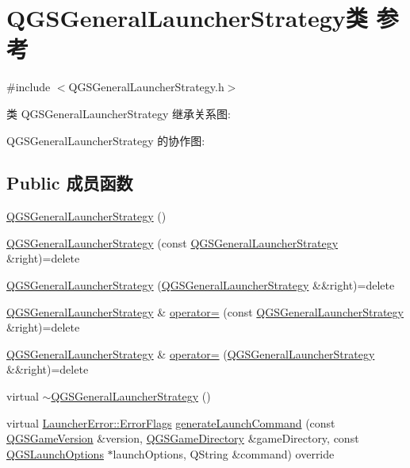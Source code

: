 \hypertarget{class_q_g_s_general_launcher_strategy}{}\section{Q\+G\+S\+General\+Launcher\+Strategy类 参考}
\label{class_q_g_s_general_launcher_strategy}


{\ttfamily \#include $<$Q\+G\+S\+General\+Launcher\+Strategy.\+h$>$}



类 Q\+G\+S\+General\+Launcher\+Strategy 继承关系图\+:


Q\+G\+S\+General\+Launcher\+Strategy 的协作图\+:
\subsection*{Public 成员函数}
\begin{DoxyCompactItemize}
\item 
\mbox{\hyperlink{class_q_g_s_general_launcher_strategy_a47665c69c318a04ef1b7cfad2ba02b64}{Q\+G\+S\+General\+Launcher\+Strategy}} ()
\item 
\mbox{\hyperlink{class_q_g_s_general_launcher_strategy_a2b0a45439670614c8e7a3dc3b9b957d9}{Q\+G\+S\+General\+Launcher\+Strategy}} (const \mbox{\hyperlink{class_q_g_s_general_launcher_strategy}{Q\+G\+S\+General\+Launcher\+Strategy}} \&right)=delete
\item 
\mbox{\hyperlink{class_q_g_s_general_launcher_strategy_abc0475b4a66105a949dbd39a6ce76596}{Q\+G\+S\+General\+Launcher\+Strategy}} (\mbox{\hyperlink{class_q_g_s_general_launcher_strategy}{Q\+G\+S\+General\+Launcher\+Strategy}} \&\&right)=delete
\item 
\mbox{\hyperlink{class_q_g_s_general_launcher_strategy}{Q\+G\+S\+General\+Launcher\+Strategy}} \& \mbox{\hyperlink{class_q_g_s_general_launcher_strategy_a0ca98a1ba31ce11c116f0b41b31785ea}{operator=}} (const \mbox{\hyperlink{class_q_g_s_general_launcher_strategy}{Q\+G\+S\+General\+Launcher\+Strategy}} \&right)=delete
\item 
\mbox{\hyperlink{class_q_g_s_general_launcher_strategy}{Q\+G\+S\+General\+Launcher\+Strategy}} \& \mbox{\hyperlink{class_q_g_s_general_launcher_strategy_a9bbe96ddfc22ca3d838d838fac810b5d}{operator=}} (\mbox{\hyperlink{class_q_g_s_general_launcher_strategy}{Q\+G\+S\+General\+Launcher\+Strategy}} \&\&right)=delete
\item 
virtual \mbox{\hyperlink{class_q_g_s_general_launcher_strategy_a1c7247fe678d2e567df659a67522d1dc}{$\sim$\+Q\+G\+S\+General\+Launcher\+Strategy}} ()
\item 
virtual \mbox{\hyperlink{namespace_launcher_error_ac3a8c0329368b890069c60ac80628085}{Launcher\+Error\+::\+Error\+Flags}} \mbox{\hyperlink{class_q_g_s_general_launcher_strategy_a224aef3dbad0412c02f2952644d00260}{generate\+Launch\+Command}} (const \mbox{\hyperlink{class_q_g_s_game_version}{Q\+G\+S\+Game\+Version}} \&version, \mbox{\hyperlink{class_q_g_s_game_directory}{Q\+G\+S\+Game\+Directory}} \&game\+Directory, const \mbox{\hyperlink{class_q_g_s_launch_options}{Q\+G\+S\+Launch\+Options}} $\ast$launch\+Options, Q\+String \&command) override
\end{DoxyCompactItemize}
